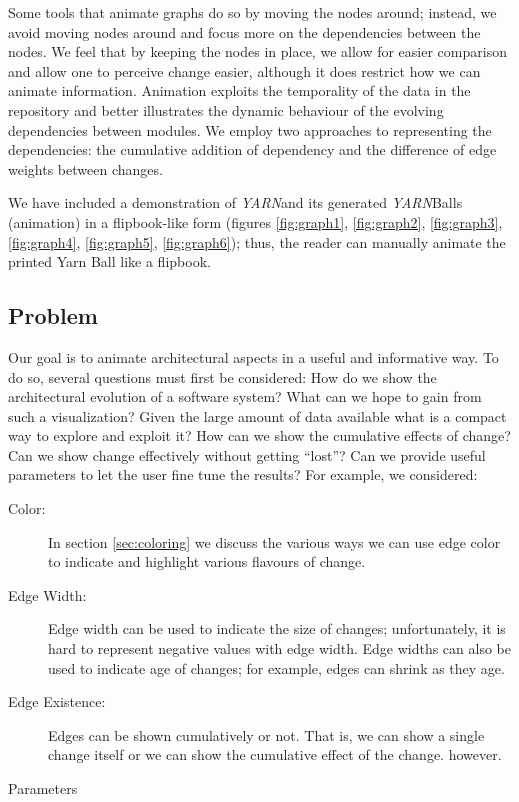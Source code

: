 \documentclass[times, 10pt,twocolumn]{article}
\newcommand{\yarn}{\emph{YARN\xspace}}
\newcommand{\YARN}{\yarn}
\newcommand{\Subsection}[1]{\subsection{#1}}
\begin{document}
Some tools that animate graphs do so by moving the nodes around; instead,
we avoid moving nodes around and focus more on the dependencies between the
nodes.  We feel that by keeping the nodes in place, we allow for easier
comparison and allow one to perceive change easier, although it does
restrict how we can animate information.  Animation exploits the
temporality of the data in the repository and better illustrates the
dynamic behaviour of the evolving dependencies between modules.  We employ
two approaches to representing the dependencies: the cumulative addition of
dependency and the difference of edge weights between changes.

We have included a demonstration of  \YARN and its generated \YARN Balls
(animation) in a flipbook-like form (figures \ref{fig:graph1},
\ref{fig:graph2}, \ref{fig:graph3}, \ref{fig:graph4}, \ref{fig:graph5},
\ref{fig:graph6}); thus, the reader can manually animate the printed Yarn
Ball like a flipbook.

\Subsection{Problem}



Our goal is to animate architectural aspects 
in a
useful and informative way.  To do so, several questions must first be
considered:  How do we show the architectural evolution of a software
system?  What can we hope to gain from such a visualization? Given the
large amount of data available what is a compact way to explore and exploit
it?  How can we show the cumulative effects of change?  Can we show change
effectively without getting ``lost''?  Can we provide useful parameters to
let the user fine tune the results?  For example, we considered:
\begin{description}
\item[Color:] In section \ref{sec:coloring} we discuss the various ways we
    can use edge color to indicate and highlight various flavours of change.
\item[Edge Width:] Edge width can be used to indicate the size of changes;
    unfortunately, it is hard to represent negative values with edge width.
    Edge widths can also be used to indicate age of changes; for example,
    edges can shrink as they age.
\item[Edge Existence:] Edges can be shown cumulatively or not.  That is,
    we can show a single change itself or we can show the cumulative effect of
    the change. 
    however.
\end{description}
Parameters 
\end{document}
